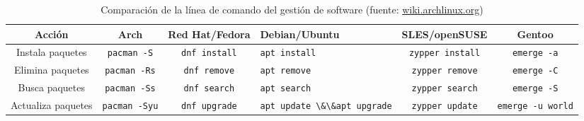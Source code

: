\documentclass[
	spanish,
	10pt,
	xcolor=table,
	handout,
	aspectratio=1610,
  ignorenonframetext
]{beamer}
\begin{document}
\begin{frame}
  \begin{table}[ht!]
    \caption{Comparación de la línea de comando del gestión de software (fuente: \url{wiki.archlinux.org})}
    \centering\footnotesize
    \begin{tabular}{cccp{50pt}cc}
      \toprule
      Acción             & Arch                    & Red Hat/Fedora          & Debian/Ubuntu                                          & SLES/openSUSE           & Gentoo
      \tabularnewline
      \midrule
      Instala paquetes   & \lstinline|pacman -S|  & \lstinline|dnf install|  & \lstinline|apt install|                                 & \lstinline|zypper install|  & \lstinline|emerge -a|
      \tabularnewline
      Elimina paquetes   & \lstinline|pacman -Rs|  & \lstinline|dnf remove|  & \lstinline|apt remove|                                 & \lstinline|zypper remove|  & \lstinline|emerge -C|
      \tabularnewline
      Busca paquetes     & \lstinline|pacman -Ss| & \lstinline|dnf search| & \lstinline|apt search|                                & \lstinline|zypper search| & \lstinline|emerge -S|
      \tabularnewline
      Actualiza paquetes & \lstinline|pacman -Syu| & \lstinline|dnf upgrade| & \lstinline|apt update \&\&|\newline\lstinline|apt upgrade| & \lstinline|zypper update| & \lstinline|emerge -u world|
      \tabularnewline
      \bottomrule
    \end{tabular}
  \end{table}

\end{frame}
\end{document}
